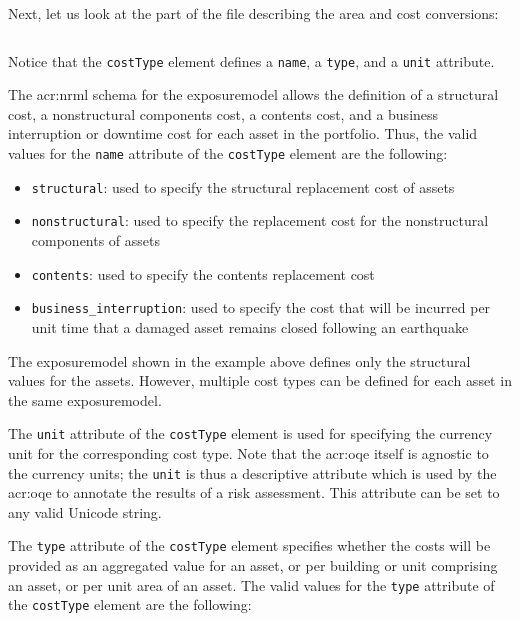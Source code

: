 Next, let us look at the part of the file describing the area and cost
conversions:

\inputminted[firstline=10,firstnumber=10,lastline=15,fontsize=\footnotesize,frame=single,linenos,bgcolor=lightgray]{xml}{oqum/risk/Verbatim/input_exposure_minimal.xml}

Notice that the \Verb+costType+ element defines a \Verb+name+, a \Verb+type+, 
and a \Verb+unit+ attribute.

The \gls{acr:nrml} schema for the \gls{exposuremodel} allows the definition of
a structural cost, a nonstructural components cost, a contents cost, and a
business interruption or downtime cost for each \gls{asset} in the portfolio.
Thus, the valid values for the \Verb+name+ attribute of the \Verb+costType+
element are the following:

\begin{itemize}

  \item \Verb+structural+: used to specify the structural replacement cost
    of assets

  \item \Verb+nonstructural+: used to specify the replacement cost for the
    nonstructural components of assets

  \item \Verb+contents+: used to specify the contents replacement cost

  \item \Verb+business_interruption+: used to specify the cost that will be 
    incurred per unit time that a damaged asset remains closed following an 
    earthquake

\end{itemize}

The \gls{exposuremodel} shown in the example above defines only the structural
values for the \glspl{asset}. However, multiple cost types can be defined for
each \gls{asset} in the same \gls{exposuremodel}.

The \Verb+unit+ attribute of the \Verb+costType+ element is used for
specifying the currency unit for the corresponding cost type. Note that the
\glsdesc{acr:oqe} itself is agnostic to the currency units; the \Verb+unit+ is
thus a descriptive attribute which is used by the \glsdesc{acr:oqe} to annotate the
results of a risk assessment. This attribute can be set to any valid Unicode
string.

The \Verb+type+ attribute of the \Verb+costType+ element specifies whether the
costs will be provided as an aggregated value for an asset, or per building or
unit comprising an \gls{asset}, or per unit area of an \gls{asset}. The valid
values for the \Verb+type+ attribute of the \Verb+costType+ element are the
following:

